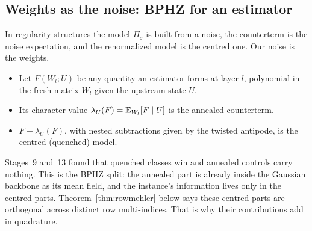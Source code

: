 \subsection{Weights as the noise: BPHZ for an estimator}\label{sec:bphz}
In regularity structures the model $\Pi_\varepsilon$ is built from a noise, the counterterm is the noise expectation, and the renormalized
model is the centred one. Our noise is the weights.
\begin{itemize}[leftmargin=*]
\item Let $F(W_l;U)$ be any quantity an estimator forms at layer $l$, polynomial in the fresh matrix $W_l$ given the upstream state $U$.
\item Its character value $\lambda_U(F)=\mathbb E_{W_l}[F\mid U]$ is the annealed counterterm.
\item $F-\lambda_U(F)$, with nested subtractions given by the twisted antipode, is the centred (quenched) model.
\end{itemize}
Stages~9 and~13 found that quenched classes win and annealed controls carry nothing. This is the BPHZ split: the annealed part is already
inside the Gaussian backbone as its mean field, and the instance's information lives only in the centred parts. Theorem~\ref{thm:rowmehler}
below says these centred parts are orthogonal across distinct row multi-indices. That is why their contributions add in quadrature.

